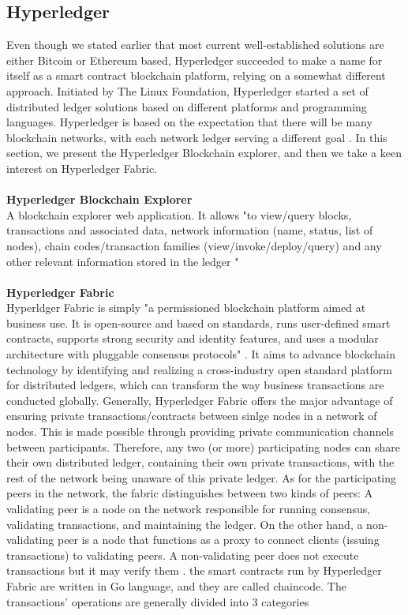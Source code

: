 \documentclass[a4paper]{article}
\begin{document}
\subsection{Hyperledger}
Even though we stated earlier that most current well-established solutions are either Bitcoin or Ethereum based, Hyperledger succeeded to make a name for itself as a smart contract blockchain platform, relying on a somewhat different approach. Initiated by The Linux Foundation, Hyperledger started a set of distributed ledger solutions based on different platforms and programming languages. Hyperledger is based on the expectation that there will be many blockchain networks, with each network ledger serving a different goal \cite{hype}. In this section, we present the Hyperledger Blockchain explorer, and then we take a keen interest on Hyperledger Fabric.
\\
\\
\textbf{\large{Hyperledger Blockchain Explorer}}\\
A blockchain explorer web application. It allows "to view/query blocks, transactions and associated data, network information (name, status, list of nodes), chain codes/transaction families (view/invoke/deploy/query) and any other relevant information stored in the ledger " \cite{hyperledger}
\\
\\
\textbf{\large{Hyperledger Fabric}}\\
Hyperldger Fabric is simply "a permissioned blockchain platform aimed at business use. It is open-source and based on standards, runs user-defined smart contracts, supports strong security and identity features, and uses a modular architecture with pluggable consensus protocols" \cite{hyper}. It aims to advance blockchain technology by identifying and realizing a cross-industry open standard platform for distributed ledgers, which can transform the way business transactions are conducted globally. Generally, Hyperledger Fabric offers the major advantage of ensuring private transactions/contracts between sinlge nodes in a network of nodes. This is made possible through providing 
private communication channels between participants. Therefore, any two (or more) participating nodes can share their own distributed ledger, containing their own private transactions, with the rest of the network being unaware of this private ledger. As for the participating peers in the network, the fabric distinguishes between two kinds of peers: A validating peer is a node on the network responsible for running consensus, validating transactions, and maintaining the ledger. On the other hand, a non-validating peer is a node that functions as a proxy to connect clients (issuing transactions) to validating peers. A non-validating peer does not execute transactions but it may verify them \cite{hyper}. the smart contracts run by Hyperledger Fabric are written in Go language, and they are called chaincode. The transactions' operations are generally divided into 3 categories\\
\end{document}
